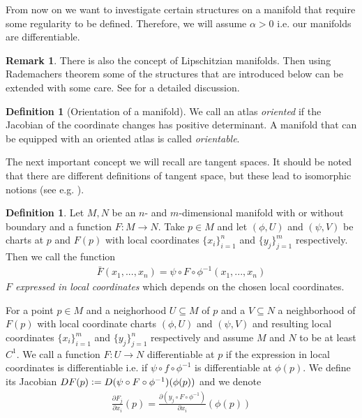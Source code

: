 \documentclass[12pt,a4paper]{article}
\numberwithin{equation}{subsection}
\numberwithin{lemma}{subsection}
\theoremstyle{definition}
\newtheorem{definition}[lemma]{Definition}
\newtheorem{remark}[lemma]{Remark}
\begin{document}
From now on we want to investigate certain structures on a manifold 
that require some regularity to be defined. Therefore, 
we will assume $\alpha > 0$ i.e. our manifolds are 
differentiable.

\begin{remark}
    There is also the concept of Lipschitzian manifolds. Then using Rademachers 
    theorem some of the structures that are introduced below can be extended 
    with some care. See \cite{lipschitz_manifolds} for a detailed discussion.
\end{remark}

\begin{definition}[Orientation of a manifold]
    We call an atlas \textit{oriented} if the Jacobian of the coordinate
    changes has positive determinant. A manifold that can be equipped with 
    an oriented atlas is called \textit{orientable}.
\end{definition}

The next important concept we will recall are tangent spaces. 
It should be noted that there are different definitions of tangent space, but
these lead to isomorphic notions 
(see e.g. \cite[Sec.\,1.B]{riemannian_geometry}).

\begin{definition}
    Let $M, N$ be an $n$- and $m$-dimensional manifold with or without boundary 
    and a function $F: M \rightarrow N$. Take $p \in M$ and let $(\phi, U)$ 
    and $(\psi,V)$ be charts at $p$ and $F(p)$ with local 
    coordinates $\{x_i\}_{i=1}^n$ and $\{y_j\}_{j=1}^m$ respectively. 
    Then we call the function 
    \begin{align*}
        \bar{F} (x_1,...,x_n) = \psi \circ F \circ \phi^{-1}(x_1,...,x_n)        
    \end{align*}
    \textit{$F$ expressed in local coordinates} which depends
    on the chosen local coordinates.
\end{definition}

For a point $p \in M$ and a neighorhood $U \subseteq M$ of $p$ and 
a $V \subseteq N$ a neighborhood of $F(p)$ with local coordinate charts 
$(\phi, U)$ and $(\psi, V)$  and resulting local coordinates 
$\{x_i\}_{i=1}^m$ and $\{ y_j\}_{j=1}^n$ respectively and assume 
$M$ and $N$ to be at least $C^1$. We call a function 
$F: U \rightarrow N$ differentiable at $p$ if the expression in local coordinates
is differentiable i.e. if 
$\psi \circ f \circ \phi^{-1}$ is differentiable
at $\phi(p)$.
We define its Jacobian $DF(p) \vcentcolon= D(\psi \circ F \circ \phi^{-1})(\phi(p))$ 
and we denote 
\begin{align}
    \frac{\partial F_j}{\partial x_i}(p) 
    = \frac{\partial (y_j \circ F \circ \phi^{-1})}{\partial x_i} (\phi(p))
    \label{eq:derivative_on_manifold} 
\end{align}
\end{document}
